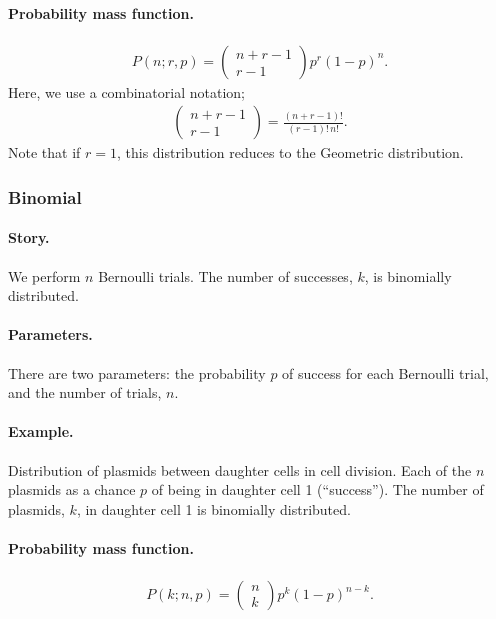 \paragraph{Probability mass function.}
\begin{align}
P(n;r,p) = \begin{pmatrix}
n+r-1 \\
r-1
\end{pmatrix}
p^r (1-p)^n.
\end{align}
Here, we use a combinatorial notation;
\begin{align}
  \begin{pmatrix}
n+r-1 \\
r-1
\end{pmatrix} = \frac{(n+r-1)!}{(r-1)!\,n!}.
\end{align}
Note that if $r = 1$, this distribution reduces to the Geometric
distribution.



\subsubsection{Binomial}
\paragraph{Story.} We perform $n$ Bernoulli trials.  The number of
successes, $k$, is binomially distributed.
\paragraph{Parameters.} There are two parameters: the probability $p$
of success for each Bernoulli trial, and the number of trials, $n$.
\paragraph{Example.} Distribution of plasmids between daughter cells
in cell division.  Each of the $n$ plasmids as a chance $p$ of being
in daughter cell 1 (``success'').  The number of plasmids, $k$, in
daughter cell 1 is binomially distributed.
\paragraph{Probability mass function.}
\begin{align}
P(k;n,p) = \begin{pmatrix}
n \\
k
\end{pmatrix}
p^k (1-p)^{n-k}.
\end{align}



